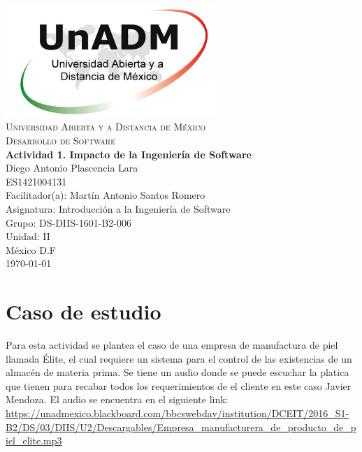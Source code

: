 \documentclass[spanish,12pt,letterpapper]{article}
\begin{document}
	\begin{titlepage}
		\begin{center}
			\includegraphics[width=0.6\textwidth]{../logoUnADM}~\\[1cm] 
			\textsc{Universidad Abierta y a Distancia de México}\\[0.8cm]
			\textsc{Desarrollo de Software}\\[1.8cm]
			
			\textbf{ \Large Actividad 1. Impacto de la Ingeniería de Software}\\[3cm]
			
			Diego Antonio Plascencia Lara\\ ES1421004131 \\[0.4cm]
			Facilitador(a): Martín Antonio Santos Romero\\
			Asignatura: Introducción a la Ingeniería de Software\\
			Grupo: DS-DIIS-1601-B2-006 \\
			Unidad: II \\
			
			\vfill México D.F\\{\today}
			
		\end{center}
	\end{titlepage}
	
	\section{Caso de estudio}
	Para esta actividad se plantea el caso de una empresa de manufactura de piel llamada Élite, el cual requiere un sistema para el control de las existencias de un almacén de materia prima. Se tiene un audio donde se puede escuchar la platica que tienen para recabar todos los requerimientos de el cliente en este caso Javier Mendoza. El audio se encuentra en el siguiente link:\\
	\url{https://unadmexico.blackboard.com/bbcswebdav/institution/DCEIT/2016_S1-B2/DS/03/DIIS/U2/Descargables/Empresa_manufacturera_de_producto_de_piel_elite.mp3}
	
\end{document}
